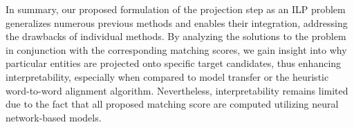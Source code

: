 In summary, our proposed formulation of the projection step as an ILP problem generalizes numerous
previous methods and enables their integration, addressing the drawbacks of individual methods.
By analyzing the solutions to the problem in conjunction with the corresponding matching scores,
we gain insight into why particular entities are projected onto specific target candidates, thus
enhancing interpretability, especially when compared to model transfer or the heuristic word-to-word
alignment algorithm. Nevertheless, interpretability remains limited due to the fact that all
proposed matching score are computed utilizing neural network-based models.
